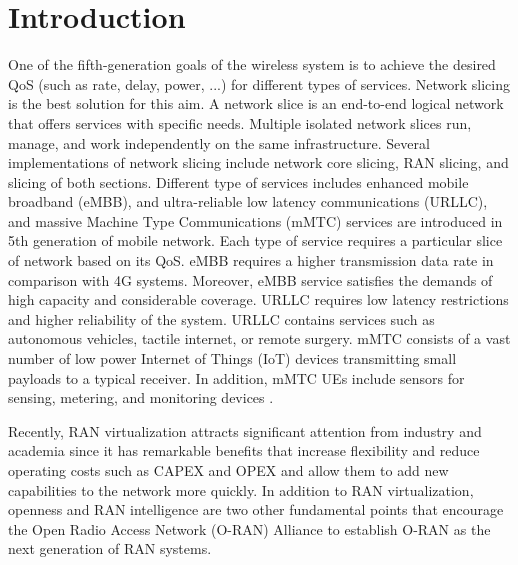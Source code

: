 \documentclass[conference]{IEEEtran}
\begin{document}
\section{Introduction} 
One of the fifth-generation goals of the wireless system is to achieve the desired QoS (such as rate, delay, power, ...) for different types of services. Network slicing is the best solution for this aim. A network slice is an end-to-end logical network that offers services with specific needs.  
Multiple isolated network slices run, manage, and work independently on the same infrastructure. 
Several implementations of network slicing include network core slicing, RAN slicing, and slicing of both sections. 
Different type of services includes enhanced mobile broadband (eMBB), and ultra-reliable low latency communications (URLLC), and massive Machine Type Communications (mMTC) services are introduced in 5th generation of mobile network. Each type of service requires a particular slice of network based on its QoS.
eMBB requires a higher transmission data rate in comparison with 4G systems. Moreover, eMBB service satisfies the demands of high capacity and considerable coverage.
URLLC requires low latency restrictions and higher reliability of the system.
URLLC contains services such as autonomous vehicles, tactile internet, or remote surgery.
mMTC consists of a vast number of low power Internet of Things (IoT) devices transmitting small payloads to a typical receiver. In addition, mMTC UEs include sensors for sensing, metering, and monitoring devices 
\cite{shen2020ai,setayesh2020joint,popovski20185g,dogra2020survey,kassab2018coexistence,alsenwi2021intelligent}.

Recently, RAN virtualization attracts significant attention from industry and academia since it has remarkable benefits that increase flexibility and reduce operating costs such as CAPEX and OPEX and allow them to add new capabilities to the network more quickly. In addition to RAN virtualization, openness and RAN intelligence are two other fundamental points that encourage the Open Radio Access Network (O-RAN) Alliance to establish O-RAN as the next generation of RAN systems. 
\end{document}
